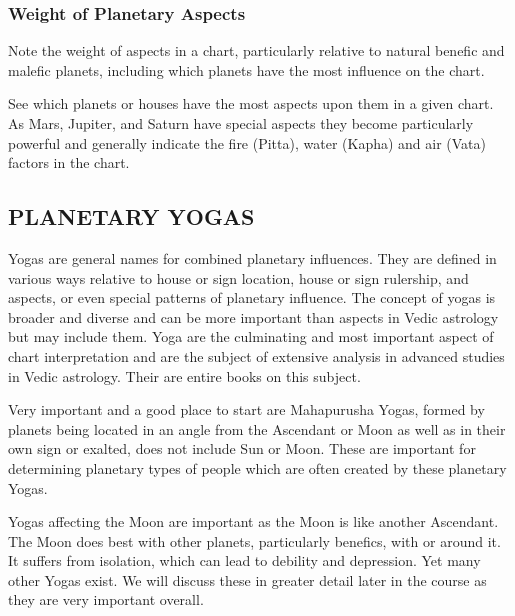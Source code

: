 

\subsubsection{Weight of Planetary Aspects}

Note the weight of aspects in a chart, particularly relative to natural benefic and malefic planets, including which planets have the most influence on the chart.

See which planets or houses have the most aspects upon them in a given chart. As Mars, Jupiter, and Saturn have special aspects they become particularly powerful and generally indicate the fire (Pitta), water (Kapha) and air (Vata) factors in the chart.

 

\subsection{PLANETARY YOGAS}
 

Yogas are general names for combined planetary influences. They are defined in various ways relative to house or sign location, house or sign rulership, and aspects, or even special patterns of planetary influence. The concept of yogas is broader and diverse and can be more important than aspects in Vedic astrology but may include them. Yoga are the culminating and most important aspect of chart interpretation and are the subject of extensive analysis in advanced studies in Vedic astrology. Their are entire books on this subject.

 

Very important and a good place to start are Mahapurusha Yogas, formed by planets being located in an angle from the Ascendant or Moon as well as in their own sign or exalted, does not include Sun or Moon. These are important for determining planetary types of people which are often created by these planetary Yogas.

 

Yogas affecting the Moon are important as the Moon is like another Ascendant. The Moon does best with other planets, particularly benefics, with or around it. It suffers from isolation, which can lead to debility and depression. Yet many other Yogas exist. We will discuss these in greater detail later in the course as they are very important overall.